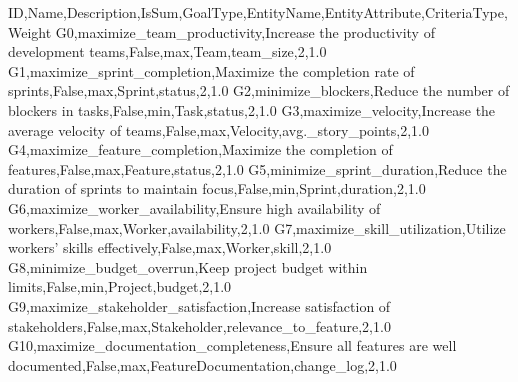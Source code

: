 ID,Name,Description,IsSum,GoalType,EntityName,EntityAttribute,CriteriaType,Weight
G0,maximize_team_productivity,Increase the productivity of development teams,False,max,Team,team_size,2,1.0
G1,maximize_sprint_completion,Maximize the completion rate of sprints,False,max,Sprint,status,2,1.0
G2,minimize_blockers,Reduce the number of blockers in tasks,False,min,Task,status,2,1.0
G3,maximize_velocity,Increase the average velocity of teams,False,max,Velocity,avg._story_points,2,1.0
G4,maximize_feature_completion,Maximize the completion of features,False,max,Feature,status,2,1.0
G5,minimize_sprint_duration,Reduce the duration of sprints to maintain focus,False,min,Sprint,duration,2,1.0
G6,maximize_worker_availability,Ensure high availability of workers,False,max,Worker,availability,2,1.0
G7,maximize_skill_utilization,Utilize workers' skills effectively,False,max,Worker,skill,2,1.0
G8,minimize_budget_overrun,Keep project budget within limits,False,min,Project,budget,2,1.0
G9,maximize_stakeholder_satisfaction,Increase satisfaction of stakeholders,False,max,Stakeholder,relevance_to_feature,2,1.0
G10,maximize_documentation_completeness,Ensure all features are well documented,False,max,FeatureDocumentation,change_log,2,1.0